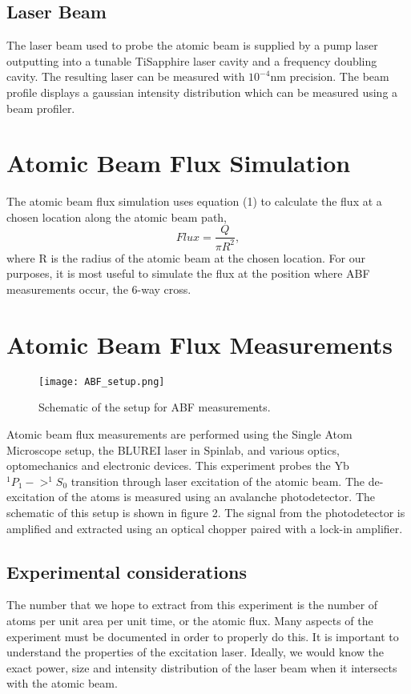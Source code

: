 \documentclass[12pt, a4paper]{article}
\begin{document}
\subsection{Laser Beam}
The laser beam used to probe the atomic beam is supplied by a pump laser outputting into a tunable TiSapphire laser cavity and a frequency doubling cavity. The resulting laser can be measured with $10^{-4}$nm precision. The beam profile displays a gaussian intensity distribution which can be measured using a beam profiler. 

\section{Atomic Beam Flux Simulation}
The atomic beam flux simulation uses equation (1) to calculate the flux at a chosen location along the atomic beam path,
\begin{equation}
Flux = \frac{Q}{\pi R^{2}},
\end{equation}
where R is the radius of the atomic beam at the chosen location. For our purposes, it is most useful to simulate the flux at the position where ABF measurements occur, the 6-way cross. 


\section{Atomic Beam Flux Measurements}
\begin{wrapfigure}{r}{0.5\textwidth}
  \texttt{[image: ABF\_setup.png]}
  \vspace*{-3mm}
  \caption{Schematic of the setup for ABF measurements.}
\end{wrapfigure}
Atomic beam flux measurements are performed using the Single Atom Microscope setup, the BLUREI laser in Spinlab, and various optics, optomechanics and electronic devices. This experiment probes the Yb $^{1}P_{1} -> ^{1}S_{0}$ transition through laser excitation of the atomic beam. The de-excitation of the atoms is measured using an avalanche photodetector. The schematic of this setup is shown in figure 2. The signal from the photodetector is amplified and extracted using an optical chopper paired with a lock-in amplifier. 
\subsection{Experimental considerations}
The number that we hope to extract from this experiment is the number of atoms per unit area per unit time, or the atomic flux. Many aspects of the experiment must be documented in order to properly do this. It is important to understand the properties of the excitation laser. Ideally, we would know the exact power, size and intensity distribution of the laser beam when it intersects with the atomic beam. 
\end{document}
